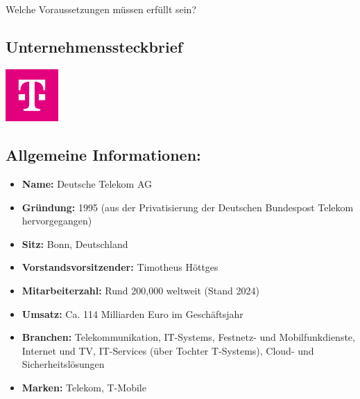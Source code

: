 \documentclass[12pt,a4paper]{article}
\begin{document}
	Welche Voraussetzungen müssen erfüllt sein?
	
	\newpage
	\printbibliography[heading=bibintoc,title={Literaturverzeichnis}]
	
	
	\newpage
	
	\begin{center}
		\section*{Unternehmenssteckbrief}
	\end{center}  
	\begin{flushright}
		\includegraphics[width=2cm]{./images/dl-telekom-logo.jpg} %
	\end{flushright}
	\vspace*{-2cm} 
	\subsection*{Allgemeine Informationen:}
	{\footnotesize
		\begin{itemize}[left=1.5em, itemsep=0.5pt]
			\item \textbf{Name:} Deutsche Telekom AG
			\item \textbf{Gründung:} 1995 (aus der Privatisierung der Deutschen Bundespost Telekom hervorgegangen)
			\item \textbf{Sitz:} Bonn, Deutschland
			\item \textbf{Vorstandsvorsitzender:} Timotheus Höttges
			\item \textbf{Mitarbeiterzahl:} Rund 200{,}000 weltweit (Stand 2024)
			\item \textbf{Umsatz:} Ca. 114 Milliarden Euro im Geschäftsjahr
			\item \textbf{Branchen:} Telekommunikation, IT-Systems, Festnetz- und Mobilfunkdienste, Internet und TV, IT-Services (über Tochter T-Systems), Cloud- und Sicherheitslösungen
			\item \textbf{Marken:} Telekom, T-Mobile
		\end{itemize}
	}
\end{document}
